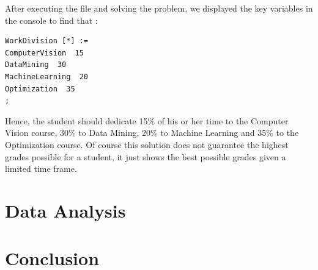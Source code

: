 After executing the file and solving the problem, we displayed the key variables in the console to find that :
\begin{verbatim}
WorkDivision [*] :=
ComputerVision  15
DataMining  30
MachineLearning  20
Optimization  35
;
\end{verbatim}
Hence, the student should dedicate 15\% of his or her time to the Computer Vision course, 30\% to Data Mining, 20\% to Machine Learning and 35\% to the Optimization course. Of course this solution does not guarantee the highest grades possible for a student, it just shows the best possible grades given a limited time frame. 
\section{Data Analysis}

\section{Conclusion}

